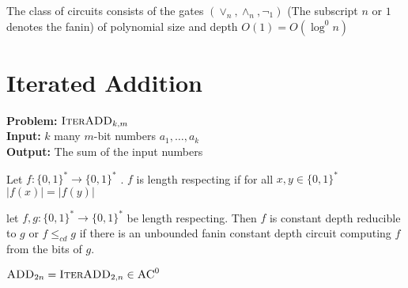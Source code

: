 \begin{definition}[$\textsc{AC}^0$]
	The class of circuits consists of the gates $(\vee_n,\wedge_n,\neg_1)$ (The subscript $n$ or $1$ denotes the fanin) of polynomial size and depth $O(1)=O(\log^0 n)$ 
\end{definition}



\section{Iterated Addition}
\textbf{Problem:} $\textsc{IterADD}_{k,m}$\\
\textbf{Input:} $k$ many $m$-bit numbers $a_1,\dots,a_k$\\
\textbf{Output:} The sum of the input numbers\\

\begin{definition}
Let $f:\{0,1\}^* \to \{0,1\}^*$ . $f$ is length respecting if for all $x,y\in \{0,1\}^*$ $|f(x)|=|f(y)|$
\end{definition}

\begin{definition}
	let  $f,g:\{0,1\}^*\to \{0,1\}^*$  be length respecting. Then $f$ is constant depth reducible to $g$ or $f\leq_{cd} g$  if there is an unbounded fanin constant depth circuit computing $f$ from the bits of $g$.
\end{definition}
\begin{theorem}
	$\textsc{ADD}_{2n}=\textsc{IterADD}_{2,n}\in \textsc{AC}^0$
\end{theorem}
